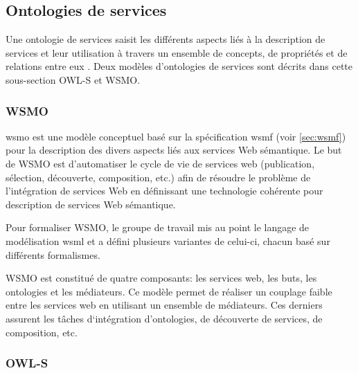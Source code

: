   \subsection{Ontologies de services}
  \label{sec:ontologies-services}

  Une ontologie de services saisit les différents aspects liés à la
  description de services et leur utilisation à travers un ensemble de
  concepts, de propriétés et de relations entre eux
  \cite{elie2010}. Deux modèles d'ontologies de services sont décrits
  dans cette sous-section \textsc{OWL-S} et \textsc{WSMO}.

    \subsubsection{WSMO}
    \label{sec:wsmo}

    \acrshort{wsmo} \cite{de2005web} est une modèle conceptuel basé
    sur la spécification \acrshort{wsmf} \cite{fensel2002web} (voir
    \ref{sec:wsmf}) pour la description des divers aspects liés aux
    services Web sémantique. Le but de \textsc{WSMO} est d'automatiser
    le cycle de vie de services web (publication, sélection,
    découverte, composition, etc.) afin de résoudre le problème de
    l'intégration de services Web en définissant une technologie
    cohérente pour description de services Web sémantique.

    Pour formaliser \textsc{WSMO}, le groupe de travail mis au point
    le langage de modélisation \acrshort{wsml} \cite{de2006web} et a
    défini plusieurs variantes de celui-ci, chacun basé sur différents
    formalismes.

    \textsc{WSMO} est constitué de quatre composants: les services
    web, les buts, les ontologies et les médiateurs. Ce modèle permet
    de réaliser un couplage faible entre les services web en utilisant
    un ensemble de médiateurs. Ces derniers assurent les tâches
    d‘intégration d'ontologies, de découverte de services, de
    composition, etc.

    \subsubsection{OWL-S}
    \label{sec:owl-s-1}

